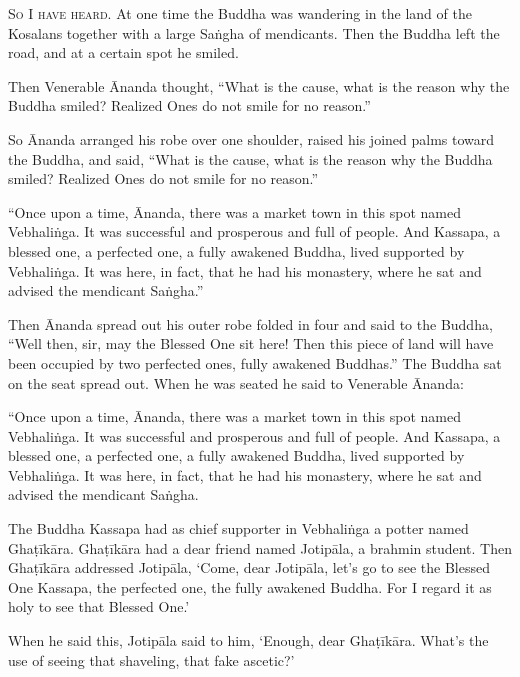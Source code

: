\documentclass[12pt,openany]{book}%
\newcommand*{\scevam}[1]{\textsc{#1}}
\begin{document}
\scevam{So I have heard. }At one time the Buddha was wandering in the land of the Kosalans together with a large \textsanskrit{Saṅgha} of mendicants. Then the Buddha left the road, and at a certain spot he smiled. 

Then Venerable Ānanda thought, “What is the cause, what is the reason why the Buddha smiled? Realized Ones do not smile for no reason.” 

So Ānanda arranged his robe over one shoulder, raised his joined palms toward the Buddha, and said, “What is the cause, what is the reason why the Buddha smiled? Realized Ones do not smile for no reason.” 

“Once upon a time, Ānanda, there was a market town in this spot named \textsanskrit{Vebhaliṅga}. It was successful and prosperous and full of people. And Kassapa, a blessed one, a perfected one, a fully awakened Buddha, lived supported by \textsanskrit{Vebhaliṅga}. It was here, in fact, that he had his monastery, where he sat and advised the mendicant \textsanskrit{Saṅgha}.” 

Then Ānanda spread out his outer robe folded in four and said to the Buddha, “Well then, sir, may the Blessed One sit here! Then this piece of land will have been occupied by two perfected ones, fully awakened Buddhas.” The Buddha sat on the seat spread out. When he was seated he said to Venerable Ānanda: 

“Once upon a time, Ānanda, there was a market town in this spot named \textsanskrit{Vebhaliṅga}. It was successful and prosperous and full of people. And Kassapa, a blessed one, a perfected one, a fully awakened Buddha, lived supported by \textsanskrit{Vebhaliṅga}. It was here, in fact, that he had his monastery, where he sat and advised the mendicant \textsanskrit{Saṅgha}. 

The Buddha Kassapa had as chief supporter in \textsanskrit{Vebhaliṅga} a potter named \textsanskrit{Ghaṭīkāra}. \textsanskrit{Ghaṭīkāra} had a dear friend named \textsanskrit{Jotipāla}, a brahmin student. Then \textsanskrit{Ghaṭīkāra} addressed \textsanskrit{Jotipāla}, ‘Come, dear \textsanskrit{Jotipāla}, let’s go to see the Blessed One Kassapa, the perfected one, the fully awakened Buddha. For I regard it as holy to see that Blessed One.’ 

When he said this, \textsanskrit{Jotipāla} said to him, ‘Enough, dear \textsanskrit{Ghaṭīkāra}. What’s the use of seeing that shaveling, that fake ascetic?’ 
\end{document}
